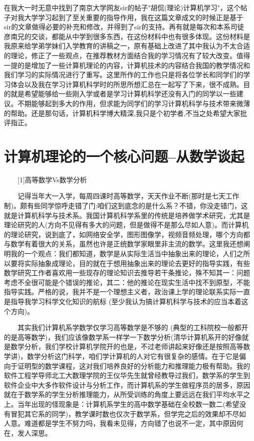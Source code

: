 在我大一时无意中找到了南京大学网友sir的帖子"胡侃(理论)计算机学习"，这个帖子对我大学学习起到了至关重要的指导作用，我在这篇文章成文的时候正是基于sir的文章做得必要的补充和修改，并得到了sir的支持。再有就是每次和本系司徒彦南兄的交谈，都能从中学到很多东西，在这份材料中也有很多体现。这份材料是我原来给学弟学妹们入学教育的讲稿之一，原有基础上改进了其中我认为不太合适的理论，修正了一些观点，在推荐教材方面结合我的学习情况有了较大改变。值得一提的是增加了一些计算机理论的内容，计算机技术的内容结合我国的教学情况和我们学习的实际情况进行了重写。这里所作的工作也只是将各位学长和同学们的学习体会以及我在学习计算机科学时的所思所想汇总在一起写了下来，很不成熟。目的就是希望能够给一些刚入学或者是学习计算机科学还没有入门的同学以一些建议。不期能够起到多大的作用，但求能为同学们的学习计算机科学与技术带来微薄的帮助。还是那句话，计算机科学博大精深,我只是个初学者,不当之处希望大家批评指正。 

\section{计算机理论的一个核心问题--从数学谈起}

　　[1]高等数学Vs数学分析 

　　记得当年大一入学，每周四课时高等数学，天天作业不断(那时是七天工作制)。颇有些同学惊呼走错了门:咱们这到底念的是什么系？不错，你没走错门，这就是计算机科学与技术系。我国计算机科学系里的传统是培养做学术研究，尤其是理论研究的人(方向不见得有多大的问题，但是做得不是那么尽如人意)。而计算机的理论研究，说到底了，如网络安全学，图形图像学，视频音频处理，哪个方向都与数学有着很大的关系，虽然也许是正统数学家眼里非主流的数学。这里我还想阐明我的一个观点：我们都知道，数学是从实际生活当中抽象出来的理论，人们之所以要将实际抽象成理论，目的就在于想用抽象出来的理论去更好的指导实践，有些数学研究工作者喜欢用一些现存的理论知识去推导若干条推论，殊不知其一：问题考虑不全很可能是个错误的推论，其二：他的推论在现实生活中找不到原型，不能指导实践。严格的说，我并不是一个理想主义者，政治课上学的理论联系实际一直是指导我学习科学文化知识的航标 (至少我认为搞计算机科学与技术的应当本着这个方向)。 

　　其实我们计算机系学数学仅学习高等数学是不够的 (典型的工科院校一般都开的是高等数学)，我们应该像数学系一样学一下数学分析(清华计算机系开的好像就是数学分析，我们学校计算机学院开的也是，不过老师讲起来好像还是按照高等数学讲)，数学分析这门科学，咱们学计算机的人对它有很复杂的感情。在于它是偏向于证明型的数学课程，这对我们培养良好的分析能力和推理能力极有帮助。我的软件工程学导师北工大数理学院的王仪华先生就曾经教导过我们，数学系的学生到软件企业中大多作软件设计与分析工作，而计算机系的学生做程序员的居多，原因就在于数学系的学生分析推理能力，从所受训练的角度上要远远在我们平均水平之上。当年出现的怪现象是：计算机系学生的高中数学基础在全校数一数二(希望没有冒犯其它系的同学)，教学课时数也仅次于数学系，但学完之后的效果却不尽如人意。难道都是学生不努力吗，我看未见得，方向错了也说不一定，其中原因何在，发人深思。 

